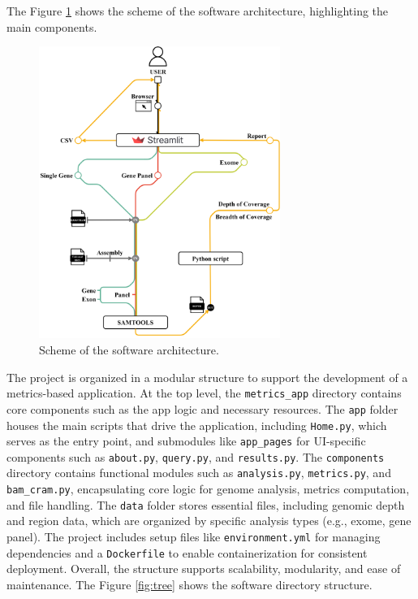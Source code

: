 The Figure \ref{fig:architecture} shows the scheme of the software architecture, highlighting the main components.
\begin{figure}[H]
    \centering
    \includegraphics[width=0.7\textwidth]{figs/architecture.png}
    \caption{Scheme of the software architecture.} 
    \label{fig:architecture}
\end{figure}


The project is organized in a modular structure to support the development of a metrics-based application. At the top level, the \texttt{metrics\_app} directory contains core components such as the app logic and necessary resources. The \texttt{app} folder houses the main scripts that drive the application, including \texttt{Home.py}, which serves as the entry point, and submodules like \texttt{app\_pages} for UI-specific components such as \texttt{about.py}, \texttt{query.py}, and \texttt{results.py}. The \texttt{components} directory contains functional modules such as \texttt{analysis.py}, \texttt{metrics.py}, and \texttt{bam\_cram.py}, encapsulating core logic for genome analysis, metrics computation, and file handling. The \texttt{data} folder stores essential files, including genomic depth and region data, which are organized by specific analysis types (e.g., exome, gene panel). The project includes setup files like \texttt{environment.yml} for managing dependencies and a \texttt{Dockerfile} to enable containerization for consistent deployment. Overall, the structure supports scalability, modularity, and ease of maintenance. The Figure \ref{fig:tree} shows the software directory structure.

